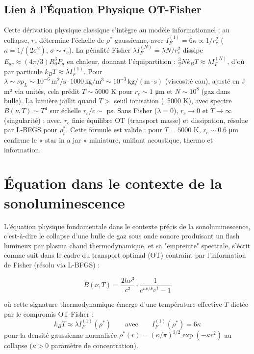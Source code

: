 \documentclass[a4paper,12pt]{article}
\begin{document}
\subsection{Lien à l'Équation Physique OT-Fisher}
Cette dérivation physique classique s'intègre au modèle informationnel : au collapse, \( r_c \) détermine l'échelle de \(\rho^*\) gaussienne, avec \( I_F^{(1)} = 6 \kappa \propto 1 / r_c^2 \) (\(\kappa = 1/(2 \sigma^2)\), \(\sigma \sim r_c\)). La pénalité Fisher \(\lambda I_F^{(N)} = \lambda N / r_c^2\) dissipe \( E_{ac} \approx (4 \pi / 3) R_0^3 P_a\) en chaleur, donnant l'équipartition : \( \frac{3}{2} N k_B T \approx \lambda I_F^{(N)} \), d'où par particule \( k_B T \approx \lambda I_F^{(1)} \). Pour \(\lambda \sim \nu \rho_L \sim 10^{-6} \, \text{m}^2/\text{s} \cdot 1000 \, \text{kg}/\text{m}^3 \sim 10^{-3} \, \text{kg}/(\text{m} \cdot \text{s})\) (viscosité eau), ajusté en J m² via unités, cela prédit \( T \sim 5000 \) K pour \( r_c \sim 1 \) μm et \( N \sim 10^8 \) (gaz dans bulle). La lumière jaillit quand \( T > \) seuil ionisation (~5000 K), avec spectre \( B(\nu, T) \sim T^4 \) sur échelle \( r_c / c \sim \) ps. Sans Fisher (\(\lambda = 0\)), \( r_c \rightarrow 0 \) et \( T \rightarrow \infty \) (singularité) ; avec, \( r_c \) finie équilibre OT (transport masse) et dissipation, résolue par L-BFGS pour \(\rho_t^*\). Cette formule est valide : pour \( T = 5000 \) K, \( r_c \sim 0.6 \) μm confirme le « star in a jar » miniature, unifiant acoustique, thermo et information.
\newpage
\section{Équation dans le contexte de la sonoluminescence}

L'équation physique fondamentale dans le contexte précis de la sonoluminescence, c'est-à-dire le collapse d'une bulle de gaz sous onde sonore produisant un flash lumineux par plasma chaud thermodynamique, et sa "empreinte" spectrale, s'écrit comme suit dans le cadre du transport optimal (OT) contraint par l'information de Fisher (résolu via L-BFGS) :

\begin{equation}
B(\nu, T) = \frac{2 h \nu^3}{c^2} \cdot \frac{1}{e^{h\nu / k_B T} - 1}
\end{equation}

où cette signature thermodynamique émerge d'une température effective $T$ dictée par le compromis OT-Fisher :
\begin{equation}
k_B T \approx \lambda I_F^{(1)}(\rho^*) \qquad \text{avec} \qquad I_F^{(1)}(\rho^*) = 6\kappa
\end{equation}
pour la densité gaussienne normalisée $\rho^*(r) = (\kappa/\pi)^{3/2} \exp(-\kappa r^2)$ au collapse ($\kappa > 0$ paramètre de concentration).
\end{document}
